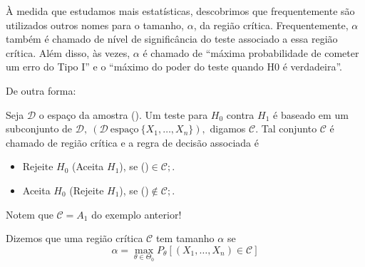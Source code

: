 \documentclass[12pt]{beamer}
\begin{document}
\begin{frame}{}
\begin{block}{}
\justifying
À medida que estudamos mais estatísticas, descobrimos que frequentemente são utilizados outros nomes para o tamanho, $\alpha$, da região crítica. Frequentemente, $\alpha$ também é chamado de nível de significância do teste associado a essa região crítica. Além disso, às vezes, $\alpha$ é chamado de ``máxima probabilidade de cometer um erro do Tipo I'' e o ``máximo do poder do teste quando H0 é verdadeira''.     
\end{block}
\end{frame}

\begin{frame}{De outra forma:}
\begin{block}{}
\justifying
    Seja $\mathcal{D}$ o espaço da amostra (\seqX). Um teste para $H_{0}$ contra $H_{1}$ é baseado em um subconjunto de $\mathcal{D},~(\mathcal{D}~\text{espaço}~\{X_{1},\ldots,X_{n}\}),$ digamos $\mathcal{C}.$ Tal conjunto $\mathcal{C}$ é chamado de região crítica e a regra de decisão associada é
    \begin{itemize}
    \item Rejeite $H_{0}$ (Aceita $H_{1}$), se (\seqX)$\in \mathcal{C};$.
    \item Aceita $H_{0}$ (Rejeite $H_{1}$), se (\seqX)$\notin \mathcal{C};$.
\end{itemize}
\end{block}
\pause
\begin{block}{}
    Notem que $\mathcal{C}=A_{1}$ do exemplo anterior!
\end{block}
\end{frame}

\begin{frame}{}
\begin{definicao}
\justifying
Dizemos que uma região crítica $\mathcal{C}$ tem tamanho $\alpha$ se $$\alpha=\max_{\theta\in \Theta_{0}} P_{\theta}[(X_{1},\ldots,X_{n})\in\mathcal{C}]$$
\end{definicao}
\end{frame}
\end{document}

